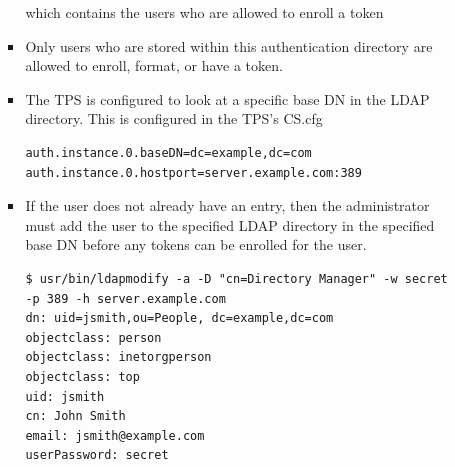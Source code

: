 \documentclass[12pt]{report}
\begin{document}
\begin{itemize}
\begin{itemize}
\begin{itemize}
                            which contains the users who are allowed to enroll a token
                        \item Only users who are stored within this authentication directory are allowed to enroll,
                             format, or have a token.
                        \item The TPS is configured to look at a specific base DN in the LDAP directory. This is configured in the TPS's CS.cfg
                            \begin{lstlisting}[style=configFile]
auth.instance.0.baseDN=dc=example,dc=com
auth.instance.0.hostport=server.example.com:389
                            \end{lstlisting}
                        \item  If the user does not already have an entry, then the administrator must add the user to the
                            specified LDAP directory in the specified base DN before any tokens can be enrolled for the user.
                            \begin{lstlisting}[style=bashInputStyle]
$ usr/bin/ldapmodify -a -D "cn=Directory Manager" -w secret -p 389 -h server.example.com
dn: uid=jsmith,ou=People, dc=example,dc=com
objectclass: person
objectclass: inetorgperson
objectclass: top
uid: jsmith
cn: John Smith
email: jsmith@example.com
userPassword: secret
                            \end{lstlisting}
                     \end{itemize}
            \end{itemize}
    \end{itemize}    
\end{document}
